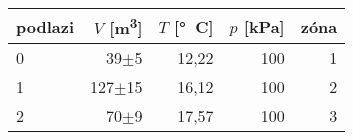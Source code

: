 \begin{tabular}{lrrrr}
\toprule
podlazi & $V$ [\si{m^3}]& $T$ [\si{\degree C}]& $p$ [\si{kPa}] & zóna\\
\midrule
0 &         39$\pm$5& 12,22& 100&1 \\
1 &       127$\pm$15& 16,12& 100&2 \\
2 &         70$\pm$9& 17,57& 100&3 \\
\bottomrule
\end{tabular}
